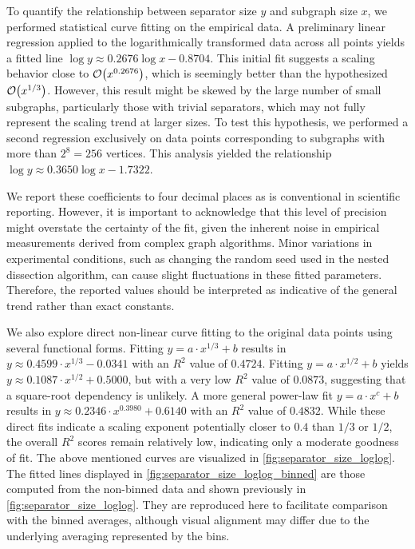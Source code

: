 To quantify the relationship between separator size \( y \) and subgraph size \( x \), we performed statistical curve fitting on the empirical data.
A preliminary linear regression applied to the logarithmically transformed data across all points yields a fitted line \( \log y \approx 0.2676 \log x - 0.8704 \).
This initial fit suggests a scaling behavior close to \( \mathcal{O}\!\left(x^{0.2676}\right) \), which is seemingly better than the hypothesized \( \mathcal{O}\!\left(x^{1/3}\right) \).
However, this result might be skewed by the large number of small subgraphs, particularly those with trivial separators, which may not fully represent the scaling trend at larger sizes.
To test this hypothesis, we performed a second regression exclusively on data points corresponding to subgraphs with more than \( 2^8 = 256 \) vertices.
This analysis yielded the relationship \( \log y \approx 0.3650 \log x - 1.7322 \).

We report these coefficients to four decimal places as is conventional in scientific reporting.
However, it is important to acknowledge that this level of precision might overstate the certainty of the fit, given the inherent noise in empirical measurements derived from complex graph algorithms.
Minor variations in experimental conditions, such as changing the random seed used in the nested dissection algorithm, can cause slight fluctuations in these fitted parameters.
Therefore, the reported values should be interpreted as indicative of the general trend rather than exact constants.

We also explore direct non-linear curve fitting to the original data points using several functional forms.
Fitting \( y = a \cdot x^{1/3} + b \) results in \( y \approx 0.4599 \cdot x^{1/3} - 0.0341 \) with an \( R^2 \) value of \( 0.4724 \).
Fitting \( y = a \cdot x^{1/2} + b \) yields \( y \approx 0.1087 \cdot x^{1/2} + 0.5000 \), but with a very low \( R^2 \) value of \( 0.0873 \), suggesting that a square-root dependency is unlikely.
A more general power-law fit \( y = a \cdot x^c + b \) results in \( y \approx 0.2346 \cdot x^{0.3980} + 0.6140 \) with an \( R^2 \) value of \( 0.4832 \).
While these direct fits indicate a scaling exponent potentially closer to \( 0.4 \) than \( 1/3 \) or \( 1/2 \), the overall \( R^2 \) scores remain relatively low, indicating only a moderate goodness of fit.
The above mentioned curves are visualized in \cref{fig:separator_size_loglog}.
The fitted lines displayed in \cref{fig:separator_size_loglog_binned} are those computed from the non-binned data and shown previously in \cref{fig:separator_size_loglog}.
They are reproduced here to facilitate comparison with the binned averages, although visual alignment may differ due to the underlying averaging represented by the bins.

